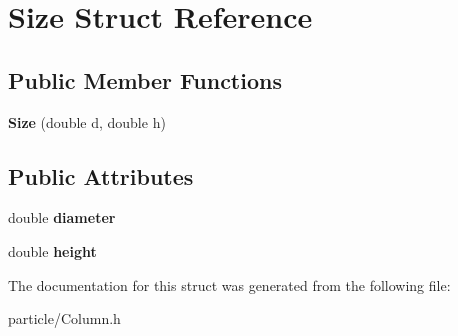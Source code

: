 \hypertarget{struct_size}{}\section{Size Struct Reference}
\label{struct_size}
\subsection*{Public Member Functions}
\begin{DoxyCompactItemize}
\item 
\mbox{\label{struct_size_a66e878d7986fe3b8829c60683ba1fcbf}} 
{\bfseries Size} (double d, double h)
\end{DoxyCompactItemize}
\subsection*{Public Attributes}
\begin{DoxyCompactItemize}
\item 
\mbox{\label{struct_size_af7794ce7f52b3b5c43ec67302ea5e313}} 
double {\bfseries diameter}
\item 
\mbox{\label{struct_size_a0222024b6e039f76ff8fce795dc0ec6c}} 
double {\bfseries height}
\end{DoxyCompactItemize}


The documentation for this struct was generated from the following file\+:\begin{DoxyCompactItemize}
\item 
particle/Column.\+h\end{DoxyCompactItemize}
